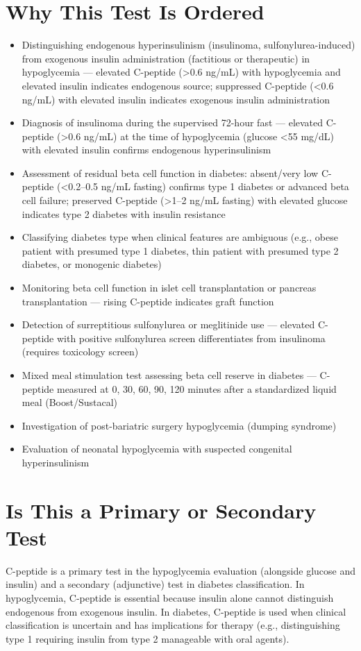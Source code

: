 \section*{Why This Test Is Ordered}
\begin{itemize}
  \item Distinguishing endogenous hyperinsulinism (insulinoma, sulfonylurea-induced) from exogenous insulin administration (factitious or therapeutic) in hypoglycemia --- elevated C-peptide (>0.6 ng/mL) with hypoglycemia and elevated insulin indicates endogenous source; suppressed C-peptide (<0.6 ng/mL) with elevated insulin indicates exogenous insulin administration
  \item Diagnosis of insulinoma during the supervised 72-hour fast --- elevated C-peptide (>0.6 ng/mL) at the time of hypoglycemia (glucose <55 mg/dL) with elevated insulin confirms endogenous hyperinsulinism
  \item Assessment of residual beta cell function in diabetes: absent/very low C-peptide (<0.2--0.5 ng/mL fasting) confirms type 1 diabetes or advanced beta cell failure; preserved C-peptide (>1--2 ng/mL fasting) with elevated glucose indicates type 2 diabetes with insulin resistance
  \item Classifying diabetes type when clinical features are ambiguous (e.g., obese patient with presumed type 1 diabetes, thin patient with presumed type 2 diabetes, or monogenic diabetes)
  \item Monitoring beta cell function in islet cell transplantation or pancreas transplantation --- rising C-peptide indicates graft function
  \item Detection of surreptitious sulfonylurea or meglitinide use --- elevated C-peptide with positive sulfonylurea screen differentiates from insulinoma (requires toxicology screen)
  \item Mixed meal stimulation test assessing beta cell reserve in diabetes --- C-peptide measured at 0, 30, 60, 90, 120 minutes after a standardized liquid meal (Boost/Sustacal)
  \item Investigation of post-bariatric surgery hypoglycemia (dumping syndrome)
  \item Evaluation of neonatal hypoglycemia with suspected congenital hyperinsulinism
\end{itemize}

\section*{Is This a Primary or Secondary Test}
C-peptide is a primary test in the hypoglycemia evaluation (alongside glucose and insulin) and a secondary (adjunctive) test in diabetes classification. In hypoglycemia, C-peptide is essential because insulin alone cannot distinguish endogenous from exogenous insulin. In diabetes, C-peptide is used when clinical classification is uncertain and has implications for therapy (e.g., distinguishing type 1 requiring insulin from type 2 manageable with oral agents).

